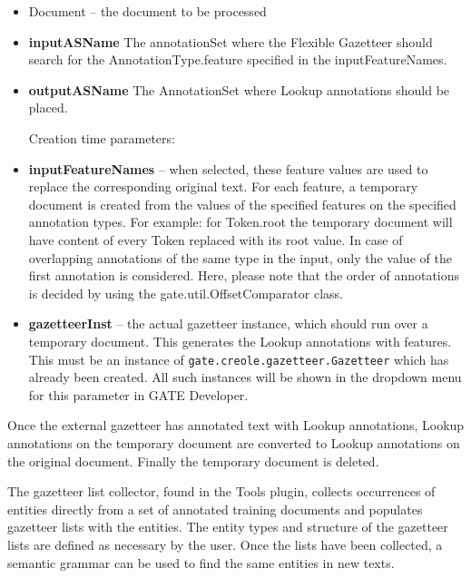 \begin{itemize}

\item Document -- the document to be processed

\item \textbf{inputASName} The annotationSet where the Flexible
Gazetteer should search for the AnnotationType.feature specified in the
inputFeatureNames.

\item \textbf{outputASName} The AnnotationSet where Lookup
annotations should be placed.

Creation time parameters:

\item \textbf{inputFeatureNames} -- when selected, these feature values are used to
replace the corresponding original text.  For each feature, a temporary document is 
created from the values of the specified features on the specified annotation types. For
example: for Token.root the temporary document will have content of every Token 
replaced with its root value.  In case of overlapping annotations of the same type in 
the input, only the value of the first annotation is considered.  Here, please note that 
the order of annotations is decided by using the gate.util.OffsetComparator class.

\item \textbf{gazetteerInst} -- the actual gazetteer instance, which should run
over a temporary document. This generates the Lookup annotations with features.
This must be an instance of {\tt gate.creole.gazetteer.Gazetteer} which has
already been created. All such instances will be shown in the dropdown menu
for this parameter in GATE Developer.

\end{itemize}

Once the external gazetteer has annotated text with Lookup annotations, Lookup
annotations on the temporary document are converted to Lookup annotations on the
original document. Finally the temporary document is deleted.

The gazetteer list collector, found in the Tools plugin, collects occurrences of
entities directly from a set of annotated training documents and populates
gazetteer lists with the entities. The entity types and structure of the
gazetteer lists are defined as necessary by the user. Once the lists have been
collected, a semantic grammar can be used to find the same entities in new
texts.

